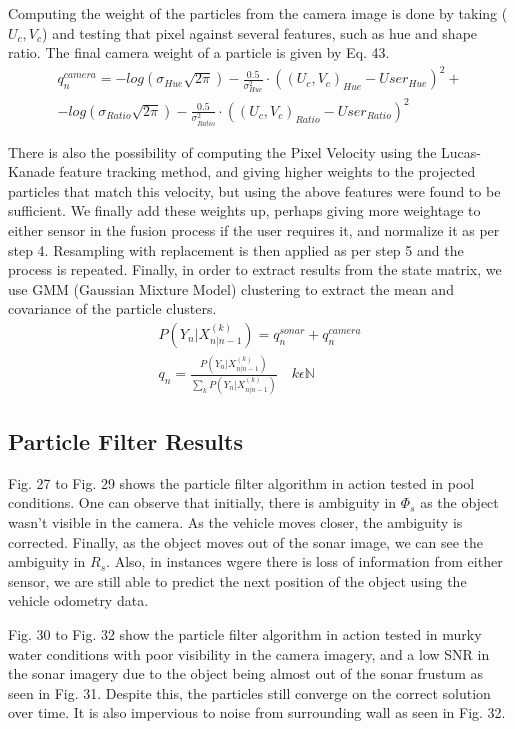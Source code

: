 \documentclass[15pt]{article}
\let\Phi\varPhi
\newcommand{\RSonar}{$\si{\textit{R}_{s}}$\xspace}
\newcommand{\PhiSonar}{$\si{\Phi_{s}}$\xspace}
\begin{document}
Computing the weight of the particles from the camera image is done by taking ($U_{c}, V_{c}$) and testing that pixel against several features, such as hue and shape ratio. The final camera weight of a particle is given by Eq. 43.
\begin{gather}
q_{n}^{camera}=-log(\sigma_{Hue}\sqrt{2\pi})-\frac{0.5}{\sigma_{Hue}^{2}}\cdot((U_{c},V_{c})_{Hue}-User_{Hue})^{2}+ \nonumber\\
-log(\sigma_{Ratio}\sqrt{2\pi})-\frac{0.5}{\sigma_{Ratio}^{2}}\cdot((U_{c},V_{c})_{Ratio}-User_{Ratio})^{2}
\end{gather}

There is also the possibility of computing the Pixel Velocity using the Lucas-Kanade feature tracking method, and giving higher weights to the projected particles that match this velocity, but using the above features were found to be sufficient. We finally add these weights up, perhaps giving more weightage to either sensor in the fusion process if the user requires it, and normalize it as per step 4. Resampling with replacement is then applied as per step 5 and the process is repeated. Finally, in order to extract results from the state matrix, we use GMM (Gaussian Mixture Model) clustering to extract the mean and covariance of the particle clusters.
\begin{gather}
P(Y_{n}|X_{n|n-1}^{(k)})=q_{n}^{sonar}+q_{n}^{camera} \\
q_{n}=\frac{P(Y_{n}|X_{n|n-1}^{(k)})}{\sum_{k}P(Y_{n}|X_{n|n-1}^{(k)})}\quad k\epsilon\mathbb{N}
\end{gather}

\subsection{Particle Filter Results}

Fig. 27 to Fig. 29 shows the particle filter algorithm in action tested in pool conditions. One can observe that initially, there is ambiguity in \PhiSonar as the object wasn't visible in the camera. As the vehicle moves closer, the ambiguity is corrected. Finally, as the object moves out of the sonar image, we can see the ambiguity in \RSonar. Also, in instances wgere there is loss of information from either sensor, we are still able to predict the next position of the object using the vehicle odometry data.

Fig. 30 to Fig. 32 show the particle filter algorithm in action tested in murky water conditions with poor visibility in the camera imagery, and a low SNR in the sonar imagery due to the object being almost out of the sonar frustum as seen in Fig. 31. Despite this, the particles still converge on the correct solution over time. It is also impervious to noise from surrounding wall as seen in Fig. 32. 
\end{document}
